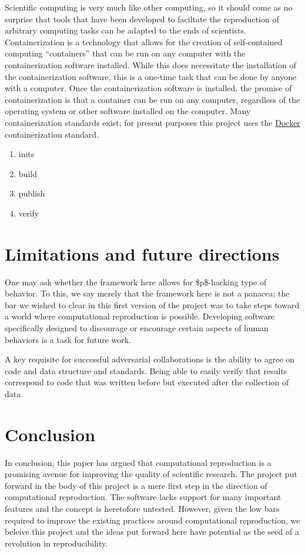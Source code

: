 Scientific computing is very much like other computing, so it should come as no surprise that tools that have been developed to faciltate the reproduction of arbitrary computing tasks can be adapted to the ends of scientists. Containerization is a technology that allows for the creation of self-contained computing ``containers'' that can be run on any computer with the containerization software installed. While this does necessitate the installation of the containerization software, this is a one-time task that can be done by anyone with a computer. Once the containerization software is installed, the promise of containerization is that a container can be run on any computer, regardless of the operating system or other software installed on the computer. Many containerization standards exist; for present purposes this project uses the \href{https://www.docker.com/}{Docker} containerization standard.

\begin{enumerate}
\itemsep -0.2em
\item inits 
\item build
\item publish
\item verify
\end{enumerate}

\hypertarget{limitations-and-future-directions}{%
\section{Limitations and future directions}\label{limitations-and-future-directions}}

One may ask whether the framework here allows for \$p\$-hacking type of behavior. To this, we say merely that the framework here is not a panacea; the bar we wished to clear in this first version of the project was to take steps toward a world where computational reproduction is possible. Developing software specifically designed to discourage or encourage certain aspects of human behaviors is a task for future work. 

A key requisite for successful adversarial collaborations is the ability to agree on code and data structure and standards. Being able to easily verify that results correspond to code that was written before but executed after the collection of data.

\hypertarget{conclusion}{%
\section{Conclusion}\label{conclusion}}

In conclusion, this paper has argued that computational reproduction is a promising avenue for improving the quality of scientific research. The project put forward in the body of this project is a mere first step in the direction of computational reproduction. The software lacks support for many important features and the concept is heretofore untested. However, given the low bars required to improve the existing practices around computational reproduction, we beleive this project and the ideas put forward here have potential as the seed of a revolution in reproducibility.
